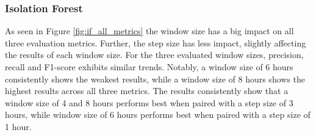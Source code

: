 \begin{figure}[t]
    \vspace{0.7cm}

    \caption{}
    \label{fig:svm_all_metrics}

    \vspace{0.5cm}
    \centering
  

\end{figure}

\subsubsection{Isolation Forest}
As seen in Figure \ref{fig:if_all_metrics} the window size has a big impact on all three evaluation metrics. Further, the step size has less impact, slightly affecting the results of each window size. For the three evaluated window sizes, precision, recall and F1-score exhibits similar trends. Notably, a window size of 6 hours consistently shows the weakest results, while a window size of 8 hours shows the highest results across all three metrics. The results consistently show that a window size of 4 and 8 hours performs best when paired with a step size of 3 hours, while window size of 6 hours performs best when paired with a step size of 1 hour. 

